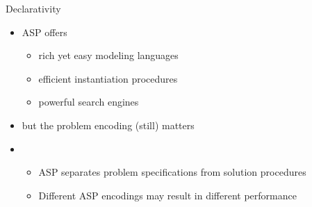 \begin{frame}[c]{Declarativity}
  \bigskip
  \begin{itemize}
  \item ASP offers
    \begin{itemize}\normalsize
    \item rich yet easy modeling languages
    \item efficient instantiation procedures
    \item powerful search engines
    \end{itemize}
  \item<2->[] but the problem encoding (still) matters
    \bigskip
  \item<3->  \
    \par\smallskip
    \begin{itemize}\normalsize
    \item ASP separates problem specifications from solution procedures
      \smallskip
    \item Different ASP encodings may result in different performance
    \end{itemize}
  \end{itemize}
\end{frame}
%
